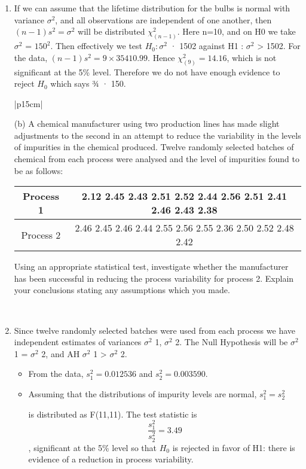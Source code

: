 \documentclass[a4paper,12pt]{article}
\begin{document}
\begin{enumerate}
\item If we can assume that the lifetime distribution for the bulbs is normal with variance $\sigma^2$,
and all observations are independent of one another, then $(n - 1)s^2=\sigma^2$ will be distributed $\chi^2_{(n-1)}$.
Here n=10, and on H0 we take $\sigma^2$ = $150^2$. Then effectively we test $H_0 : \sigma^2$ · 1502 against
H1 : $\sigma^2$ > 1502.
For the data, $(n - 1)s^2 = 9 \times 35410.99$. Hence $\chi^2_{(9)} = 14.16$, which is not significant at the 5\%
level. Therefore we do not have enough evidence to reject $H_0$ which says ¾ · 150.
\begin{table}[ht!]
 
\centering
 
\begin{tabular}{|p{15cm}|}
 
\hline  

(b) A chemical manufacturer using two production lines has made slight adjustments to the second in an attempt to reduce the variability in the levels of impurities in the chemical produced.  Twelve randomly selected batches of chemical from each process were analysed and the level of impurities found to be as follows:

\begin{center}
\begin{tabular}{|c|c|} \hline
Process 1 & 2.12 2.45 2.43 2.51 2.52 2.44 2.56 2.51 2.41 2.46 2.43 2.38\\ \hline
Process 2 & 2.46 2.45 2.46 2.44 2.55 2.56 2.55 2.36 2.50 2.52 2.48 2.42 \\ \hline
\end{tabular}
\end{center}
Using an appropriate statistical test, investigate whether the manufacturer has been successful in reducing the process variability for process 2.  
Explain your conclusions  stating any assumptions which you made.

\\ \hline
  
\end{tabular}

\end{table}

\item Since twelve randomly selected batches were used from each process we have independent estimates
of variances $\sigma^2$
1, $\sigma^2$
2. The Null Hypothesis will be $\sigma^2$
1 = $\sigma^2$
2, and AH $\sigma^2$
1 > $\sigma^2$
2.
\begin{itemize}
\item From the data, $s^2_1= 0.012536$ and $s^2_2= 0.003590$.
\item Assuming that the distributions of impurity levels are normal, $s^2_1=s^2_2$

is distributed as F(11,11).
The test statistic is \[ \frac{s^2_1}{s^2_2}
= 3.49\], significant at the 5\% level so that $H_0$ is rejected in favor of H1: there is evidence of a
reduction in process variability.
\end{itemize}
\end{enumerate}
\end{document}
